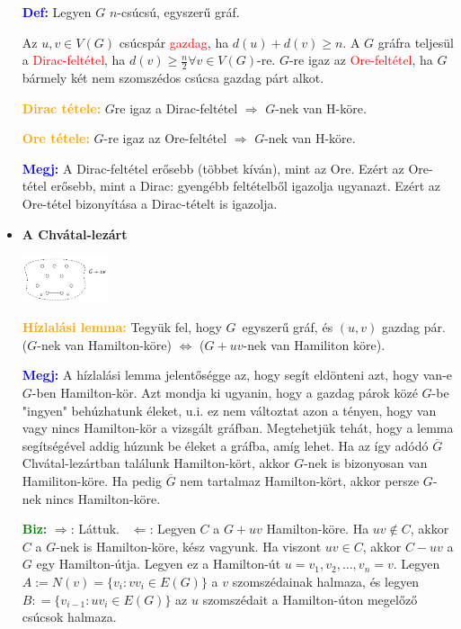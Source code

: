 \documentclass[../../szobeli.tex]{subfiles}
\begin{document}
\begin{itemize}
        \textcolor{blue}{\textbf{Def:}} Legyen $G$ $n$-csúcsú, egyszerű gráf.

        Az $u,v \in V(G)$ csúcspár \textcolor{red}{gazdag}, ha $d(u) + d(v) \geq n$. A $G$ gráfra teljesül a \textcolor{red}{Dirac-feltétel}, ha $d(v) \geq \frac{n}{2} \forall v \in V(G)$-re. $G$-re igaz az \textcolor{red}{Ore-feltétel}, ha $G$ bármely két nem szomszédos csúcsa gazdag párt alkot.

        \textcolor{orange}{\textbf{Dirac tétele:}} $G$re igaz a Dirac-feltétel $\Rightarrow$ $G$-nek van H-köre.

        \textcolor{orange}{\textbf{Ore tétele:}} $G$-re igaz az Ore-feltétel $\Rightarrow$ $G$-nek van H-köre.

        \textcolor{blue}{\textbf{Megj:}} A Dirac-feltétel erősebb (többet kíván), mint az Ore. Ezért az Ore-tétel erősebb, mint a Dirac: gyengébb feltételből igazolja ugyanazt. Ezért az Ore-tétel bizonyítása a Dirac-tételt is igazolja.

        \item \textbf{A Chvátal-lezárt} 

        \includegraphics[width=0.2\textwidth]{./img/7.png}

        \textcolor{orange}{\textbf{Hízlalási lemma:}} Tegyük fel, hogy $G$ egyszerű gráf, és $(u,v)$ gazdag pár. ($G$-nek van Hamilton-köre) $\Longleftrightarrow$ ($G + uv$-nek van Hamiliton köre).

        \textcolor{blue}{\textbf{Megj:}} A hízlalási lemma jelentőségge az, hogy segít eldönteni azt, hogy van-e $G$-ben Hamilton-kör. Azt mondja ki ugyanin, hogy a gazdag párok közé $G$-be "ingyen" behúzhatunk éleket, u.i. ez nem változtat azon a tényen, hogy van vagy nincs Hamilton-kör a vizsgált gráfban. Megtehetjük tehát, hogy a lemma segítségével addig húzunk be éleket a gráfba, amíg lehet. Ha az így adódó $\overline{G}$ Chvátal-lezártban találunk Hamilton-kört, akkor $G$-nek is bizonyosan van Hamiliton-köre. Ha pedig $\overline{G}$ nem tartalmaz Hamilton-kört, akkor persze $G$-nek nincs Hamilton-köre.

        \textcolor{green}{\textbf{Biz:}} $\Rightarrow$: Láttuk. \checkmark $\Leftarrow$: Legyen $C$ a $G + uv$ Hamilton-köre. Ha $uv \notin C$, akkor $C$ a $G$-nek is Hamilton-köre, kész vagyunk. Ha viszont $uv \in C$, akkor $C-uv$ a $G$ egy Hamilton-útja. Legyen ez a Hamilton-út $u = v_1, v_2, \dots, v_n = v$. Legyen $A:=N(v) = \{v_i:vv_i \in E(G)\}$ a $v$ szomszédainak halmaza, és legyen $B: = \{v_{i-1} : uv_i \in E(G)\}$ az $u$ szomszédait a Hamilton-úton megelőző csúcsok halmaza.


\end{itemize}
\end{document}
